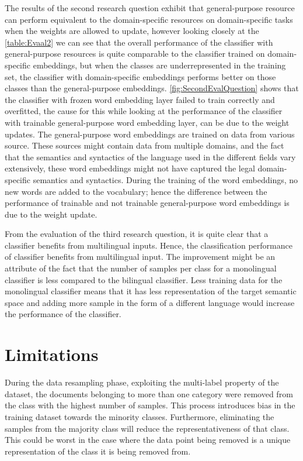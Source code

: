 The results of the second research question exhibit that general-purpose resource can perform equivalent to the domain-specific resources on domain-specific tasks when the weights are allowed to update, however looking closely at the \ref{table:Evaal2} we can see that the overall performance of the classifier with general-purpose resources is quite comparable to the classifier trained on domain-specific embeddings, but when the classes are underrepresented in the training set, the classifier with domain-specific embeddings performs better on those classes than the general-purpose embeddings. \ref{fig:SecondEvalQuestion} shows that the classifier with frozen word embedding layer failed to train correctly and overfitted, the cause for this while looking at the performance of the classifier with trainable general-purpose word embedding layer, can be due to the weight updates. The general-purpose word embeddings are trained on data from various source. These sources might contain data from multiple domains, and the fact that the semantics and syntactics of the language used in the different fields vary extensively, these word embeddings might not have captured the legal domain-specific semantics and syntactics. During the training of the word embeddings, no new words are added to the vocabulary; hence the difference between the performance of trainable and not trainable general-purpose word embeddings is due to the weight update.


From the evaluation of the third research question, it is quite clear that a classifier benefits from multilingual inputs. Hence, the classification performance of classifier benefits from multilingual input.  The improvement might be an attribute of the fact that the number of samples per class for a monolingual classifier is less compared to the bilingual classifier. Less training data for the monolingual classifier means that it has less representation of the target semantic space and adding more sample in the form of a different language would increase the performance of the classifier.


\section{Limitations}\label{sec:limitations}

During the data resampling phase, exploiting the multi-label property of the dataset, the documents belonging to more than one category were removed from the class with the highest number of samples.  This process introduces bias in the training dataset towards the minority classes. Furthermore, eliminating the samples from the majority class will reduce the representativeness of that class. This could be worst in the case where the data point being removed is a unique representation of the class it is being removed from.  


